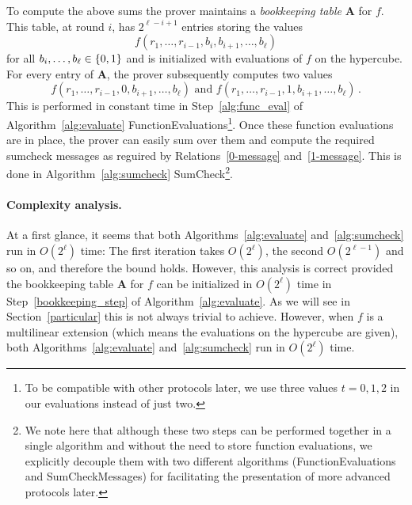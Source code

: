 To compute the above sums the prover maintains a \emph{bookkeeping table} $\textbf{A}$ for $f$. This table, at round $i$, has $2^{\ell-i+1}$ entries storing the values $$f(r_1,\ldots, r_{i-1}, b_{i}, b_{i+1},\ldots, b_{\ell})$$ for all $b_i,\ldots,b_\ell\in\{0,1\}$ and is initialized with evaluations of $f$ on the hypercube. For every entry of $\textbf{A}$, the prover subsequently computes two values $$f(r_1,\ldots, r_{i-1}, 0, b_{i+1},\ldots, b_{\ell}) 
\text{ and } f(r_1,\ldots, r_{i-1}, 1, b_{i+1},\ldots, b_{\ell})\,.$$ This is performed in constant time in Step~\ref{alg:func_eval} of Algorithm~\ref{alg:evaluate} \textsf{FunctionEvaluations}\footnote{To be compatible with other protocols later, we use three values $t=0,1,2$ in our evaluations instead of just two.}. Once these function evaluations are in place, the prover can easily sum over them and compute the required sumcheck messages as reguired by Relations~\ref{0-message} and~\ref{1-message}. This is done in Algorithm~\ref{alg:sumcheck} \textsf{SumCheck}\footnote{We note here that although these two steps  can be performed together in a single algorithm and without the need to store function evaluations, we explicitly decouple them with two different algorithms (\textsf{FunctionEvaluations} and \textsf{SumCheckMessages}) for facilitating the presentation of more advanced protocols later. }. 

\paragraph{Complexity analysis.} 
At a first glance, it seems that both Algorithms~\ref{alg:evaluate} and~\ref{alg:sumcheck} run in $O(2^\ell)$ time: The first iteration takes $O(2^\ell)$, the second $O(2^{\ell-1})$ and so on, and therefore the bound holds. However, this analysis is correct provided the bookkeeping table $\textbf{A}$ for $f$ can be initialized in $O(2^\ell)$ time in Step~\ref{bookkeeping_step} of Algorithm~\ref{alg:evaluate}. As we will see in Section~\ref{particular} this is not always trivial to achieve. However, when $f$ is a multilinear extension (which means the evaluations on the hypercube are given), both Algorithms~\ref{alg:evaluate} and~\ref{alg:sumcheck} run in $O(2^\ell)$ time. 







